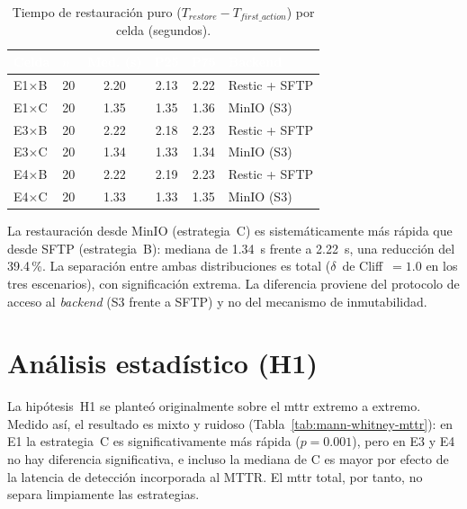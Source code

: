 \documentclass[../main.tex]{subfiles}
\begin{document}
\begin{table}[ht]
  \centering
  \begin{tabularx}{\textwidth}{C{1.8cm} C{1cm} S[table-format=1.2] S[table-format=1.2] S[table-format=1.2] X}
    \toprule
    \textcolor{white}{\textbf{Celda}} &
    \textcolor{white}{\textbf{$n$}} &
    \textcolor{white}{\textbf{Med. (s)}} &
    \textcolor{white}{\textbf{P25}} &
    \textcolor{white}{\textbf{P75}} &
    \textcolor{white}{\textbf{Backend}} \\
    \midrule
    E1$\times$B & 20 & 2.20 & 2.13 & 2.22 & Restic + SFTP \\
    E1$\times$C & 20 & 1.35 & 1.35 & 1.36 & MinIO (S3) \\
    E3$\times$B & 20 & 2.22 & 2.18 & 2.23 & Restic + SFTP \\
    E3$\times$C & 20 & 1.34 & 1.33 & 1.34 & MinIO (S3) \\
    E4$\times$B & 20 & 2.22 & 2.19 & 2.23 & Restic + SFTP \\
    E4$\times$C & 20 & 1.33 & 1.33 & 1.35 & MinIO (S3) \\
    \bottomrule
  \end{tabularx}
  \caption{Tiempo de restauración puro ($T_{restore}-T_{first\_action}$) por celda
           (segundos).}
  \label{tab:restauracion}
\end{table}

La restauración desde MinIO (estrategia~C) es sistemáticamente más rápida que desde
SFTP (estrategia~B): mediana de 1.34~s frente a 2.22~s, una reducción del
39.4\,\%. La separación entre ambas distribuciones es total ($\delta$~de Cliff~$=1.0$
en los tres escenarios), con significación extrema. La diferencia proviene del
protocolo de acceso al \emph{backend} (S3 frente a SFTP) y no del mecanismo de
inmutabilidad.

\section{Análisis estadístico (H1)}
\label{sec:estadistica-h1}

La hipótesis~H1 se planteó originalmente sobre el \gls{mttr} extremo a extremo. Medido
así, el resultado es mixto y ruidoso (Tabla~\ref{tab:mann-whitney-mttr}): en E1 la
estrategia~C es significativamente más rápida ($p = 0.001$), pero en E3 y E4 no hay
diferencia significativa, e incluso la mediana de C es mayor por efecto de la
latencia de detección incorporada al MTTR. El \gls{mttr} total, por tanto, no separa
limpiamente las estrategias.
\end{document}
